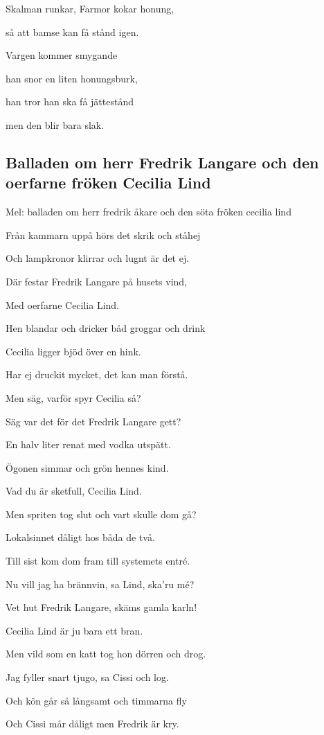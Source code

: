Skalman runkar, Farmor kokar honung,

så att bamse kan få stånd igen.\bigskip


Vargen kommer smygande

han snor en liten honungsburk,

han tror han ska få jättestånd

men den blir bara slak. 

\subsection{\textbf{Balladen om herr Fredrik Langare och den oerfarne fröken Cecilia Lind}} 

Mel: balladen om herr fredrik åkare och den söta fröken cecilia lind\bigskip


Från kammarn uppå hörs det skrik och ståhej

Och lampkronor klirrar och lugnt är det ej.

Där festar Fredrik Langare på husets vind,

Med oerfarne Cecilia Lind.\bigskip


Hen blandar och dricker båd groggar och drink

Cecilia ligger bjöd över en hink.

Har ej druckit mycket, det kan man förstå.

Men säg, varför spyr Cecilia så?\bigskip


Säg var det för det Fredrik Langare gett?

En halv liter renat med vodka utspätt.

Ögonen simmar och grön hennes kind.

Vad du är sketfull, Cecilia Lind.\bigskip


Men spriten tog slut och vart skulle dom gå?

Lokalsinnet dåligt hos båda de två.

Till sist kom dom fram till systemets entré.

Nu vill jag ha brännvin, sa Lind, ska’ru mé?\bigskip


Vet hut Fredrik Langare, skäms gamla karln!

Cecilia Lind är ju bara ett bran.

Men vild som en katt tog hon dörren och drog.

Jag fyller snart tjugo, sa Cissi och log.\bigskip


Och kön går så långsamt och timmarna fly

Och Cissi mår dåligt men Fredrik är kry.

